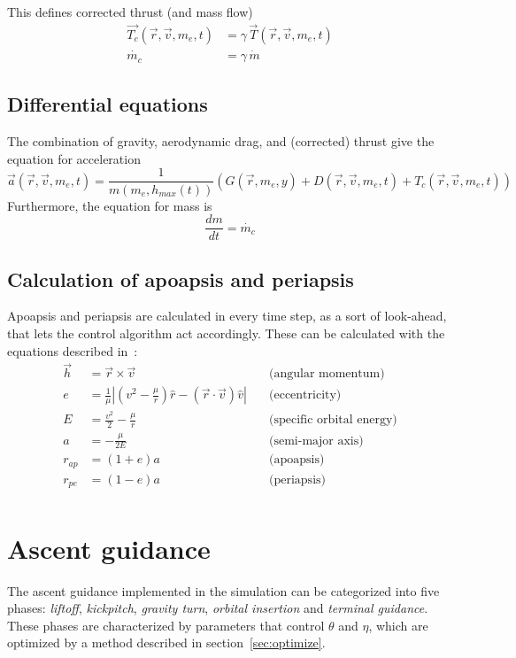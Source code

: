 \documentclass[11pt]{article}
\begin{document}
This defines corrected thrust (and mass flow)
$$
\begin{aligned}
  \vec{T_c}(\vec{r}, \vec{v}, m_e, t) & = \gamma \, \vec{T}(\vec{r}, \vec{v}, m_e, t) \\
  \dot{m_c} & = \gamma \, \dot{m}
\end{aligned}
$$
\subsection{Differential equations} \label{sec:eqns}
The combination of gravity, aerodynamic drag, and (corrected) thrust give the equation for acceleration
\begin{equation} \label{eq:diff1}
\vec{a}(\vec{r}, \vec{v}, m_e, t) = \frac{1}{m(m_e, h_{max}(t))} \left( G(\vec{r}, m_e, y) + D(\vec{r}, \vec{v}, m_e, t) + T_c(\vec{r}, \vec{v}, m_e, t) \right)
\end{equation}
Furthermore, the equation for mass is
\begin{equation} \label{eq:diff2}
\frac{dm}{dt} = \dot{m_c}
\end{equation}


\subsection{Calculation of apoapsis and periapsis}
Apoapsis and periapsis are calculated in every time step, as a sort of look-ahead, that lets the control algorithm act accordingly.
These can be calculated with the equations described in~\cite{kepler}:
$$
\begin{aligned}
  \vec{h} & = \vec{r} \times \vec{v}   
  & \quad \text{(angular momentum)} \\
  e & = \frac{1}{\mu} \left| \left( v^2 - \frac{\mu}{r} \right) \hat{r} - \left( \vec{r}\cdot\vec{v} \right) \hat{v}\right| 
  & \quad \text{(eccentricity)} \\
  E & = \frac{v^2}{2} - \frac{\mu}{r}  
  & \quad \text{(specific orbital energy)} \\
  a & = -\frac{\mu}{2E}   
  & \quad \text{(semi-major axis)} \\
  r_{ap} & = \left( 1 + e \right) a
  & \quad \text{(apoapsis)} \\
  r_{pe} & = \left( 1 - e \right) a
  & \quad \text{(periapsis)} \\
\end{aligned}
$$

\section{Ascent guidance}
The ascent guidance implemented in the simulation can be categorized into five phases: 
\textit{liftoff}, 
\textit{kickpitch}, 
\textit{gravity turn}, 
\textit{orbital insertion} and 
\textit{terminal guidance}.
These phases are characterized by parameters that control $\theta$ and $\eta$, which are optimized by a method described in section~\ref{sec:optimize}. 
\end{document}
